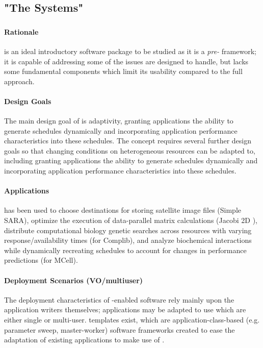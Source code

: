 \documentclass{sig-alternate}
\begin{document}
\subsection{"The Systems"}

%
\subsubsection{\apples}
\paragraph{Rationale}
\apples is an ideal introductory software package to be studied
as it is a \textit{pre-\pilot} framework; it is capable of
addressing some of the issues \pilotjobs are designed to handle,
but lacks some fundamental components which limit its usability
compared to the full \pilotjob approach.

\paragraph{Design Goals}
The main design goal of \apples is adaptivity, granting applications 
the ability to generate schedules dynamically and incorporating
application performance characteristics into these schedules.
The concept requires several further
design goals so that changing conditions on heterogeneous
resources can be adapted to, including granting applications
the ability to generate schedules dynamically and incorporating
application performance characteristics into these schedules.

\paragraph{Applications}
\apples has been used to choose destinations
for storing satellite image files (Simple SARA), 
optimize the execution of data-parallel matrix
calculations (Jacobi 2D \apples), 
distribute computational biology genetic searches
across resources with varying response/availability times 
(\apples for Complib), and
analyze biochemical interactions while dynamically recreating
schedules to account for changes in performance predictions
(\apples for MCell).

\paragraph{Deployment Scenarios (VO/multiuser)}
The deployment characteristics of \apples-enabled software rely
mainly upon the application writers themselves; applications
may be adapted to use \apples which are either single or multi-user.
\apples templates exist, which are application-class-based (e.g.
parameter sweep, master-worker) 
software frameworks created
to ease the adaptation of existing applications to make use
of \apples.
\end{document}
